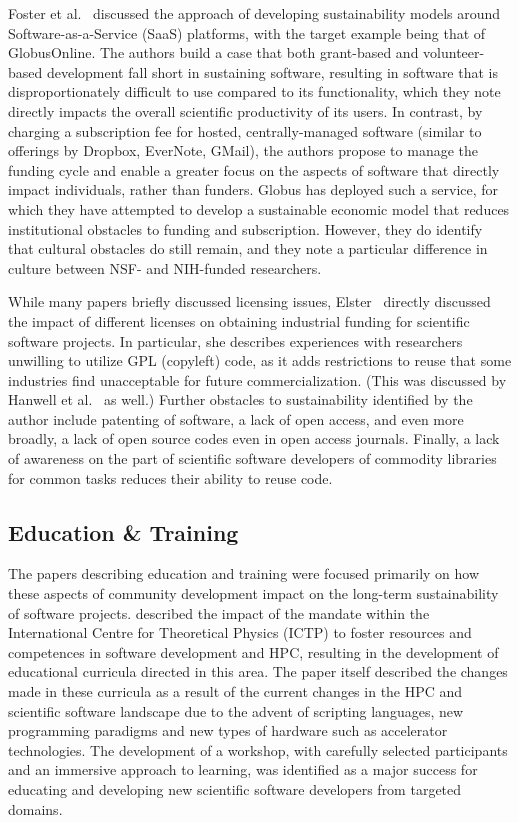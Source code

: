 \documentclass[11pt, oneside]{amsart}
\newcommand{\toolname}[1] {\textsf{#1}}
\begin{document}
Foster et al.~\cite{Foster_WSSSPE} discussed the approach of developing sustainability models
around Software-as-a-Service (SaaS) platforms, with the target example being
that of \toolname{GlobusOnline}.  The authors build a case that both grant-based and
volunteer-based development fall short in sustaining software, resulting in
software that is disproportionately difficult to use compared to its
functionality, which they note directly impacts the overall scientific
productivity of its users.  In contrast, by charging a subscription fee for
hosted, centrally-managed software (similar to offerings by \toolname{Dropbox}, \toolname{EverNote},
\toolname{GMail}), the authors propose to manage the funding cycle and enable a greater
focus on the aspects of software that directly impact individuals, rather than
funders.  \toolname{Globus} has deployed such a service, for which they have attempted to
develop a sustainable economic model that reduces institutional obstacles to
funding and subscription.  However, they do identify that cultural obstacles
do still remain, and they note a particular difference in culture between NSF-
and NIH-funded researchers.

While many papers briefly discussed licensing issues, Elster~\cite{Elster_WSSSPE}
directly discussed the impact of different licenses on obtaining industrial
funding for scientific software projects.  In particular, she describes
experiences with researchers unwilling to utilize GPL (copyleft) code, as it
adds restrictions to reuse that some industries find unacceptable for future
commercialization.  (This was discussed by Hanwell et al.~\cite{Hanwell_WSSSPE} as well.)
Further obstacles to sustainability identified by the author include patenting
of software, a lack of open access, and even more broadly, a lack of open
source codes even in open access journals.  Finally, a lack of awareness on the
part of scientific software developers of commodity libraries for common tasks
reduces their ability to reuse code.

\subsection{Education \& Training}

The papers describing education and training were focused primarily on how
these aspects of community development impact on the long-term sustainability
of software projects.  \cite{Girotto_WSSSPE} described the impact of the
mandate within the International Centre for Theoretical Physics (ICTP) to
foster resources and competences in software development and HPC, resulting in
the development of educational curricula directed in this area.  The paper
itself described the changes made in these curricula as a result of the current
changes in the HPC and scientific software landscape due to the advent of
scripting languages, new programming paradigms and new types of hardware such
as accelerator technologies.  The development of a workshop, with carefully
selected participants and an immersive approach to learning, was identified as
a major success for educating and developing new scientific software developers
from targeted domains.
\end{document}
